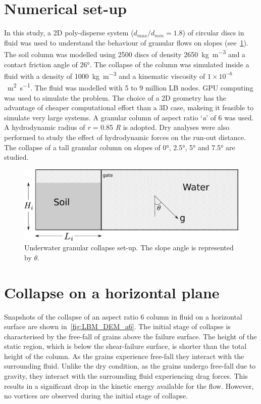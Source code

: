 \documentclass[epj,twocolumn]{webofc}
\begin{document}
\section{Numerical set-up}
In this study, a 2D poly-disperse system ($d_{max} / d_{min} = 1.8$) of
circular discs in fluid was used to understand the behaviour of granular
flows on slopes (see~\cref{fig:geometry}).
The soil column was modelled using 2500 discs of density
2650~\si{\kilogram\per\meter\cubed} and a contact friction angle of
26\si{\degree}.  The  collapse of the column was simulated inside a fluid
with a density of 1000~\si{\kilogram\per\meter\cubed} and a kinematic viscosity
of $1 \times 10^{-6}$~\si{\meter\squared\per\second}. The fluid was modelled
with 5 to 9 million LB nodes. GPU computing was used to simulate the problem.
The choice of a 2D geometry has the advantage of cheaper computational
effort than a 3D case, makeing it feasible to simulate very large systems.
A granular column of aspect ratio `\textit{a}' of 6 was used. A hydrodynamic
radius of \textit{r} = 0.85 \textit{R} is adopted. Dry analyses were also
performed to study the effect of hydrodynamic forces on the run-out distance.
The collapse of a tall granular column on slopes of 0\si{\degree},
2.5\si{\degree}, 5\si{\degree} and 7.5\si{\degree} are studied.

\begin{figure}
  \centering
  \includegraphics[width=0.95\linewidth]{figs/geometry}
  \caption{Underwater granular collapse set-up.
    The slope angle is represented by $\theta$.}
  \label{fig:geometry}
\end{figure}

\section{Collapse on a horizontal plane}
Snapshots of the collapse of an aspect ratio 6 column in fluid on a horizontal 
surface are shown in~\cref{fig:LBM_DEM_a6}. The initial stage of collapse is 
characterised by the free-fall of grains above the failure surface.
The height of the static region, which is below the shear-failure surface,
is shorter than the total height of the column. As the grains experience
free-fall they interact with the surrounding fluid. Unlike the dry condition,
as the grains undergo free-fall due to gravity, they interact 
with the surrounding fluid experiencing drag forces. This results in a 
significant drop in the kinetic energy available for the flow.
However, no vortices are observed during the initial stage of collapse.
\end{document}
